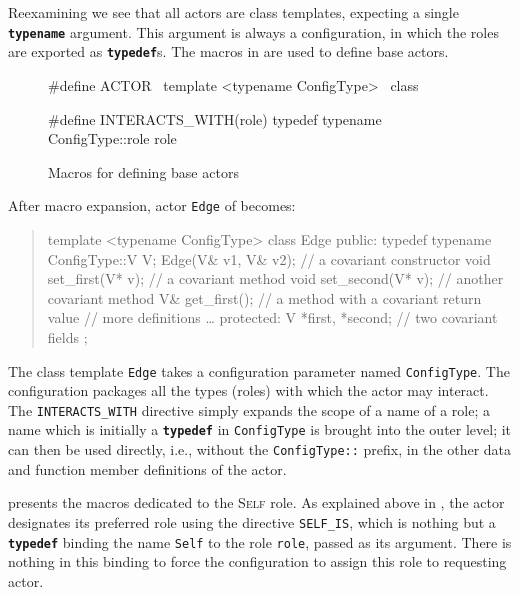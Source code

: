 \documentclass[11pt]{article}
\numberwithin{figure}{section}
\newcommand{\kw}[1]{\texttt{\textbf{#1}}}
\newcommand{\cd}[1]{\texttt{#1}}
\newenvironment{excerpt}{\begin{quote}\begin{minipage}\textwidth}{\end{minipage}\end{quote}}
\begin{document}
Reexamining  we see that all actors
    are class templates, expecting a single \kw{typename} argument.
This argument is always a configuration, in which the roles are
    exported as \kw{typedef}s.
The macros in 
    are used to define base actors.

\begin{figure}[!htb]
\CPP
#define ACTOR \
    template <typename ConfigType> \
        class

#define INTERACTS_WITH(role) typedef typename ConfigType::role role
\END\PROGce{}%
\caption{Macros for defining base actors}
\label{Figure:actor:macros}
\end{figure}


After macro expansion, actor \cd{Edge} of  becomes:
\begin{excerpt}
\CPP
template <typename ConfigType>
    class Edge { public:
        typedef typename ConfigType::V V;
        Edge(V& v1, V& v2);            // a covariant constructor
        void set_first(V* v);          // a covariant method
        void set_second(V* v);         // another covariant method
        V& get_first();                // a method with a covariant return value
        //{} more definitions \ldots
        protected: V *first, *second;  // two covariant fields
    };
\END\PROGcf{}
\end{excerpt}
The class template \cd{Edge} takes a configuration
    parameter named \cd{ConfigType}.
The configuration packages all the types (roles) with
    which the actor may interact.
The \cd{INTERACTS\_WITH} directive simply
    expands the scope of a name of a role; a name which is
        initially a \kw{typedef} in \cd{ConfigType} is brought
        into the outer level; it can then be used directly, i.e., without
            the \cd{ConfigType::} prefix, in the other data and function member
            definitions of the actor.

 presents the macros
    dedicated to the \textsc{Self} role.
As explained above in ,
    the actor designates its preferred role using
    the directive \cd{SELF\_IS}, which is nothing but
    a \kw{typedef} binding the name \cd{Self} to the role
    \cd{role}, passed as its argument.
There is nothing in this binding to force the configuration
    to assign this role to requesting actor.
\end{document}
